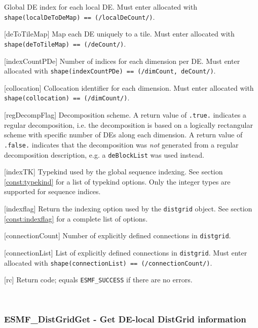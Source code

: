\begin{description}
\begin{sloppypar}
       Global DE index for each local DE. Must enter allocated with
       {\tt shape(localDeToDeMap) == (/localDeCount/)}.
     \item[{[deToTileMap]}]
       Map each DE uniquely to a tile. Must enter allocated with
       {\tt shape(deToTileMap) == (/deCount/)}.
     \item[{[indexCountPDe]}]
       Number of indices for each dimension per DE. Must enter
       allocated with {\tt shape(indexCountPDe) == (/dimCount, deCount/)}.
     \item[{[collocation]}]
       Collocation identifier for each dimension. Must enter
       allocated with {\tt shape(collocation) == (/dimCount/)}.
     \item[{[regDecompFlag]}]
       Decomposition scheme. A return value of {\tt .true.} indicates
       a regular decomposition, i.e. the decomposition is based on a 
       logically rectangular scheme with specific number of DEs along
       each dimension. A return value of {\tt .false.} indicates that the
       decomposition was {\em not} generated from a regular decomposition 
       description, e.g. a {\tt deBlockList} was used instead.
     \item[{[indexTK]}]
       Typekind used by the global sequence indexing. See section 
       \ref{const:typekind} for a list of typekind options. Only the integer
       types are supported for sequence indices.
     \item[{[indexflag]}]
       Return the indexing option used by the {\tt distgrid} object. See section
       \ref{const:indexflag} for a complete list of options.
     \item[{[connectionCount]}]
       Number of explicitly defined connections in {\tt distgrid}.
     \item[{[connectionList]}]
       List of explicitly defined connections in {\tt distgrid}. Must enter
       allocated with {\tt shape(connectionList) == (/connectionCount/)}.
     \item[{[rc]}] 
       Return code; equals {\tt ESMF\_SUCCESS} if there are no errors.
       \end{sloppypar}
     \end{description}
   
 
\mbox{}\hrulefill\ 
 
\subsubsection [ESMF\_DistGridGet] {ESMF\_DistGridGet - Get DE-local DistGrid information}


